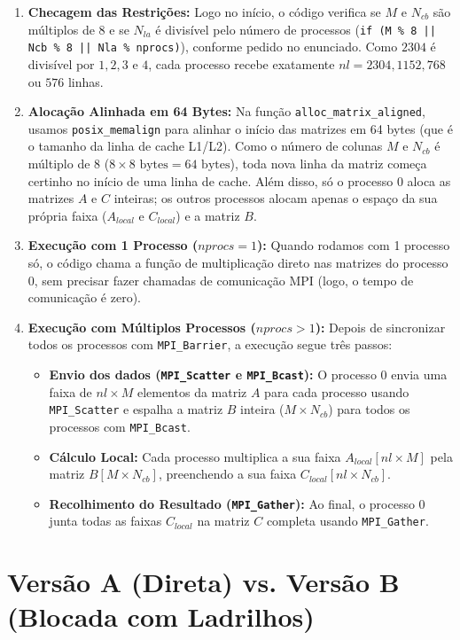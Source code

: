 \documentclass[12pt, a4paper, twoside, chapter=TITLE, subsection=TITLE, section=TITLE, subsubsection=TITLE, english, brazil]{abntex2}
\begin{document}
\begin{enumerate}
    \item \textbf{Checagem das Restrições:} Logo no início, o código verifica se $M$ e $N_{cb}$ são múltiplos de 8 e se $N_{la}$ é divisível pelo número de processos (\texttt{if (M \% 8 || Ncb \% 8 || Nla \% nprocs)}), conforme pedido no enunciado. Como $2304$ é divisível por $1, 2, 3$ e $4$, cada processo recebe exatamente $nl = 2304, 1152, 768$ ou $576$ linhas.
    \item \textbf{Alocação Alinhada em 64 Bytes:} Na função \nolinkurl{alloc_matrix_aligned}, usamos \nolinkurl{posix_memalign} para alinhar o início das matrizes em 64 bytes (que é o tamanho da linha de cache L1/L2). Como o número de colunas $M$ e $N_{cb}$ é múltiplo de 8 ($8 \times 8\text{ bytes} = 64\text{ bytes}$), toda nova linha da matriz começa certinho no início de uma linha de cache. Além disso, só o processo 0 aloca as matrizes $A$ e $C$ inteiras; os outros processos alocam apenas o espaço da sua própria faixa ($A_{local}$ e $C_{local}$) e a matriz $B$.
    \item \textbf{Execução com 1 Processo ($nprocs = 1$):} Quando rodamos com 1 processo só, o código chama a função de multiplicação direto nas matrizes do processo 0, sem precisar fazer chamadas de comunicação MPI (logo, o tempo de comunicação é zero).
    \item \textbf{Execução com Múltiplos Processos ($nprocs > 1$):} Depois de sincronizar todos os processos com \nolinkurl{MPI_Barrier}, a execução segue três passos:
    \begin{itemize}
        \item \textbf{Envio dos dados (\nolinkurl{MPI_Scatter} e \nolinkurl{MPI_Bcast}):} O processo 0 envia uma faixa de $nl \times M$ elementos da matriz $A$ para cada processo usando \nolinkurl{MPI_Scatter} e espalha a matriz $B$ inteira ($M \times N_{cb}$) para todos os processos com \nolinkurl{MPI_Bcast}.
        \item \textbf{Cálculo Local:} Cada processo multiplica a sua faixa $A_{local}[nl \times M]$ pela matriz $B[M \times N_{cb}]$, preenchendo a sua faixa $C_{local}[nl \times N_{cb}]$.
        \item \textbf{Recolhimento do Resultado (\nolinkurl{MPI_Gather}):} Ao final, o processo 0 junta todas as faixas $C_{local}$ na matriz $C$ completa usando \nolinkurl{MPI_Gather}.
    \end{itemize}
\end{enumerate}

\section{Versão A (Direta) vs. Versão B (Blocada com Ladrilhos)}
\end{document}
